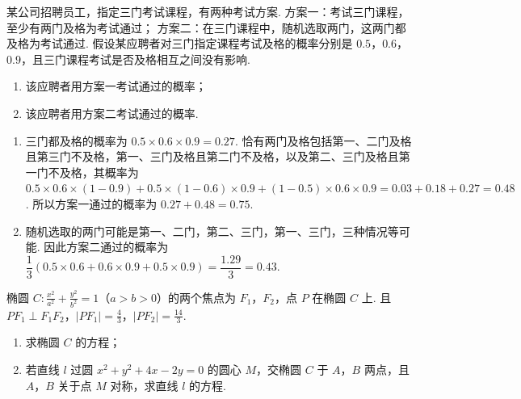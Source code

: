 \begin{problem}
某公司招聘员工，指定三门考试课程，有两种考试方案. 方案一：考试三门课程，至少有两门及格为考试通过； 方案二：在三门课程中，随机选取两门，这两门都及格为考试通过. 假设某应聘者对三门指定课程考试及格的概率分别是 \(0.5\)，\(0.6\)，\(0.9\)，且三门课程考试是否及格相互之间没有影响.

\begin{enumerate}
\item 该应聘者用方案一考试通过的概率；
\item 该应聘者用方案二考试通过的概率.
\end{enumerate}
\end{problem}

\begin{solution}
\begin{enumerate}
\item 三门都及格的概率为 \(0.5\times0.6\times0.9=0.27\). 恰有两门及格包括第一、二门及格且第三门不及格，第一、三门及格且第二门不及格，以及第二、三门及格且第一门不及格，其概率为
\(0.5\times0.6\times\left(1-0.9\right)+0.5\times\left(1-0.6\right)\times0.9+\left(1-0.5\right)\times0.6\times0.9=0.03+0.18+0.27=0.48\). 所以方案一通过的概率为 \(0.27+0.48=0.75\).
\item 随机选取的两门可能是第一、二门，第二、三门，第一、三门，三种情况等可能. 因此方案二通过的概率为
\(\dfrac13(0.5\times0.6+0.6\times0.9+0.5\times0.9)=\dfrac{1.29}{3}=0.43\).
\end{enumerate}
\end{solution}

\begin{problem}
椭圆 \(C: \frac{x^2}{a^2} + \frac{y^2}{b^2} = 1\)（\(a > b > 0\)）的两个焦点为 \(F_1\)，\(F_2\)，点 \(P\) 在椭圆 \(C\) 上. 且 \(PF_1 \perp F_1F_2\)，\(|PF_1| = \frac{4}{3}\)，\(|PF_2| = \frac{14}{3}\).

\begin{enumerate}
\item 求椭圆 \(C\) 的方程；
\item 若直线 \(l\) 过圆 \(x^{2} + y^{2} + 4x - 2y = 0\) 的圆心 \(M\)，交椭圆 \(C\) 于 \(A\)，\(B\) 两点，且 \(A\)，\(B\) 关于点 \(M\) 对称，求直线 \(l\) 的方程.
\end{enumerate}
\end{problem}

